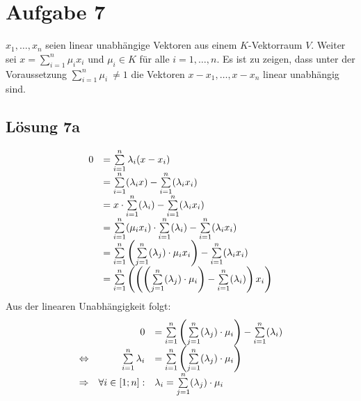 \documentclass[main.tex]{subfiles}
\begin{document}
\section{Aufgabe 7}

$x_{1}, \dotsc, x_{n}$ seien linear unabhängige Vektoren aus einem $K$-Vektorraum $V$. Weiter sei $x=\sum _{i=1}^{n} \mu _{i} x_{i}$ und $\mu _{i} \in K$ für alle $i=1, \dotsc, n$. Es ist zu zeigen, dass unter der Voraussetzung $\sum _{i=1}^{n} \mu _{i} \ \neq 1$ die Vektoren $x-x_{1}, \dotsc, x-x_{n}$ linear unabhängig sind.

\subsection{Lösung 7a}

\begin{equation*}
    \begin{array}{ c l }
        0 & =\sum\limits _{i=1}^{n} \lambda _{i}( x-x_{i})\\
        & =\sum\limits _{i=1}^{n}( \lambda _{i} x) -\sum\limits _{i=1}^{n}( \lambda _{i} x_{i})\\
        & =x\cdotp \sum\limits _{i=1}^{n}( \lambda _{i}) -\sum\limits _{i=1}^{n}( \lambda _{i} x_{i})\\
        & =\sum\limits _{i=1}^{n}( \mu _{i} x_{i}) \cdotp \sum\limits _{i=1}^{n}( \lambda _{i}) -\sum\limits _{i=1}^{n}( \lambda _{i} x_{i})\\
        & =\sum\limits _{i=1}^{n}\left(\sum\limits _{j=1}^{n}( \lambda _{j}) \cdotp \mu _{i} x_{i}\right) -\sum\limits _{i=1}^{n}( \lambda _{i} x_{i})\\
        & =\sum\limits _{i=1}^{n}\left(\left(\left(\sum\limits _{j=1}^{n}( \lambda _{j}) \cdotp \mu _{i}\right) -\sum\limits _{i=1}^{n}( \lambda _{i})\right) x_{i}\right)
    \end{array}
\end{equation*}
Aus der linearen Unabhängigkeit folgt:
\begin{equation*}
    \begin{array}{ c r l }
        & 0 & =\sum\limits _{i=1}^{n}\left(\sum\limits _{j=1}^{n}( \lambda _{j}) \cdotp \mu _{i}\right) -\sum\limits _{i=1}^{n}( \lambda _{i})\\
        \Leftrightarrow  & \sum\limits _{i=1}^{n} \lambda _{i} & =\sum\limits _{i=1}^{n}\left(\sum\limits _{j=1}^{n}( \lambda _{j}) \cdotp \mu _{i}\right)\\
        \Rightarrow  & \forall i\in [ 1;n] : & \lambda _{i} =\sum\limits _{j=1}^{n}( \lambda _{j}) \cdotp \mu _{i}
    \end{array}
\end{equation*}
\end{document}
